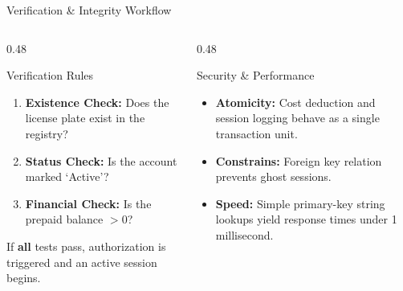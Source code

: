 \documentclass[aspectratio=169,11pt]{beamer}
\begin{document}
\begin{frame}{Verification \& Integrity Workflow}
\begin{columns}
\begin{column}{0.48\textwidth}
\begin{block}{Verification Rules}
\begin{enumerate}
    \item \textbf{Existence Check:} Does the license plate exist in the registry?
    \item \textbf{Status Check:} Is the account marked `Active'?
    \item \textbf{Financial Check:} Is the prepaid balance $> 0$?
\end{enumerate}
If \textbf{all} tests pass, authorization is triggered and an active session begins.
\end{block}
\end{column}
\begin{column}{0.48\textwidth}
\begin{block}{Security \& Performance}
\begin{itemize}
    \item \textbf{Atomicity:} Cost deduction and session logging behave as a single transaction unit.
    \item \textbf{Constrains:} Foreign key relation prevents ghost sessions.
    \item \textbf{Speed:} Simple primary-key string lookups yield response times under 1 millisecond.
\end{itemize}
\end{block}
\end{column}
\end{columns}
\end{frame}
\end{document}
